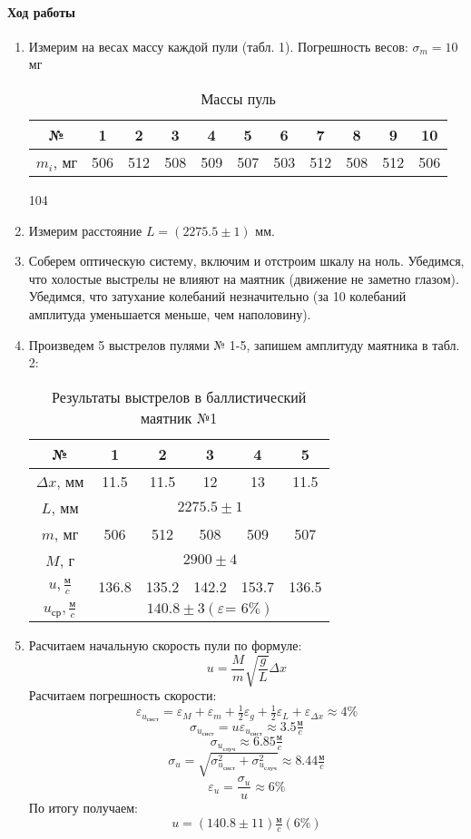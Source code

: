 \documentclass[a4paper, 10pt]{article}%
\begin{document}
	\paragraph{Ход работы}
	\begin{enumerate}
		\item Измерим на весах массу каждой пули (табл. 1). Погрешность весов: $\sigma_m = 10$ мг
		\begin{table}[h]
			\centering
			\caption{Массы пуль}
			\begin{tabular}{|c|c|c|c|c|c|c|c|c|c|c|}
				\hline
				№ & 1 & 2 & 3 & 4 & 5 & 6 & 7 & 8 & 9 & 10 \\
				\hline
				$m_i$, мг & 506 & 512 & 508 & 509 & 507 & 503 & 512 & 508 & 512 & 506 \\
				\hline
			\end{tabular}
		\end{table}104
		\item Измерим расстояние $L = (2275.5 \pm 1)$ мм.
		\item Соберем оптическую систему, включим и отстроим шкалу на ноль. Убедимся, что холостые выстрелы не влияют на маятник (движение не заметно глазом). Убедимся, что затухание колебаний незначительно (за 10 колебаний амплитуда уменьшается меньше, чем наполовину).
		\item Произведем 5 выстрелов пулями № 1-5, запишем амплитуду маятника в табл. 2:
		\begin{table}[h]
			\centering
			\caption{Результаты выстрелов в баллистический маятник №1}
			\begin{tabular}{|c|c|c|c|c|c|}
				\hline
				№ & 1 & 2 & 3 & 4 & 5 \\
				\hline
				$\Delta x$, мм & 11.5 & 11.5 & 12 & 13 & 11.5 \\
				\hline
				$L$, мм & \multicolumn{5}{|c|}{$2275.5 \pm 1$} \\
				\hline
				$m$, мг & 506 & 512 & 508 & 509 & 507 \\
				\hline
				$M$, г & \multicolumn{5}{|c|}{$2900 \pm 4$} \\
				\hline
				$u, \frac{\text{м}}{c}$ & 136.8 & 135.2 & 142.2 & 153.7 & 136.5 \\
				\hline
				$u_\text{ср}, \frac{\text{м}}{c}$ & \multicolumn{5}{|c|}{$140.8 \pm 3 (\varepsilon_{} \text{= 6\%}) $} \\

				\hline
			\end{tabular}
		\end{table}
		\item Расчитаем начальную скорость пули по формуле:
		\[u=\dfrac{M}{m}\sqrt{\dfrac{g}{L}}\Delta x\]
		Расчитаем погрешность скорости:
		\[\varepsilon_{u_\text{сист}} = \varepsilon_M + \varepsilon_m + \tfrac{1}{2}\varepsilon_g + \tfrac{1}{2}\varepsilon_L + \varepsilon_{\Delta x} \approx 4\%\]
		\[\sigma_{u_\text{сист}} = u\varepsilon_{u_\text{сист}} \approx 3.5 \tfrac{\text{м}}{c}\]
		\[\sigma_{u_\text{случ}} \approx 6.85 \tfrac{\text{м}}{c}\]
		\[\sigma_u = \sqrt{\sigma_{u_\text{сист}}^2+\sigma_{u_\text{случ}}^2} \approx 8.44 \tfrac{\text{м}}{c}\]
		\[\varepsilon_u = \frac{\sigma_u}{u} \approx 6\%\]
		По итогу получаем:
		\[u = \left(140.8 \pm 11\right) \tfrac{\text{м}}{c} (6\%)\]
		

\end{enumerate}
\end{document}

